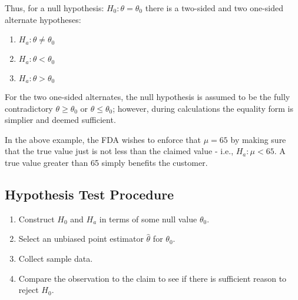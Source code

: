 \documentclass[letterpaper,12pt,fleqn]{article}
\newcommand{\m}{\mu}
\renewcommand{\O}{\theta}
\begin{document}
Thus, for a null hypothesis: \(H_0:\O=\O_0\) there is a two-sided and two one-sided alternate hypotheses:
\begin{enumerate}
\item \(H_a: \O\ne\O_0\)
\item \(H_a: \O<\O_0\)
\item \(H_a: \O>\O_0\)
\end{enumerate}
For the two one-sided alternates, the null hypothesis is assumed to be the fully contradictory \(\O\ge\O_0\) or \(\O\le\O_0\);
however, during calculations the equality form is simplier and deemed sufficient.

\begin{example}
  In the above example, the FDA wishes to enforce that \(\m=65\) by making sure that the true value just is not less than
  the claimed value - i.e., \(H_a:\m<65\).  A true value greater than 65 simply benefits the customer.
\end{example}

\subsection*{Hypothesis Test Procedure}

\begin{enumerate}
\item Construct \(H_0\) and \(H_a\) in terms of some null value \(\O_0\).
\item Select an unbiased point estimator \(\hat{\O}\) for \(\O_0\).
\item Collect sample data.
\item Compare the observation to the claim to see if there is sufficient reason to reject \(H_0\).
\end{enumerate}
\end{document}
